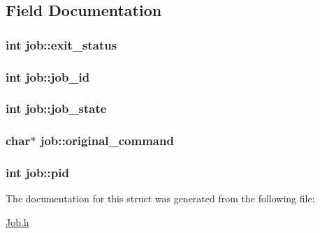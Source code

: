 \subsection{Field Documentation}
\hypertarget{structjob_a0934d39f18acc8e4f0c9f00aedf4ec4f}{
\subsubsection[{exit\-\_\-status}]{\setlength{\rightskip}{0pt plus 5cm}int job\-::exit\-\_\-status}}\label{structjob_a0934d39f18acc8e4f0c9f00aedf4ec4f}
\hypertarget{structjob_aa9ffc87c0ac4bda4c4077493ecafe56e}{
\subsubsection[{job\-\_\-id}]{\setlength{\rightskip}{0pt plus 5cm}int job\-::job\-\_\-id}}\label{structjob_aa9ffc87c0ac4bda4c4077493ecafe56e}
\hypertarget{structjob_a9799fc831fbf5f5c21c4eb769849ff6a}{
\subsubsection[{job\-\_\-state}]{\setlength{\rightskip}{0pt plus 5cm}int job\-::job\-\_\-state}}\label{structjob_a9799fc831fbf5f5c21c4eb769849ff6a}
\hypertarget{structjob_a8dca5ac3477fe184b8d1e13732b12370}{
\subsubsection[{original\-\_\-command}]{\setlength{\rightskip}{0pt plus 5cm}char$\ast$ job\-::original\-\_\-command}}\label{structjob_a8dca5ac3477fe184b8d1e13732b12370}
\hypertarget{structjob_a669785e7f9130ed80d5500104ae2f292}{
\subsubsection[{pid}]{\setlength{\rightskip}{0pt plus 5cm}int job\-::pid}}\label{structjob_a669785e7f9130ed80d5500104ae2f292}


The documentation for this struct was generated from the following file\-:\begin{DoxyCompactItemize}
\item 
\hyperlink{Job_8h}{Job.\-h}\end{DoxyCompactItemize}
